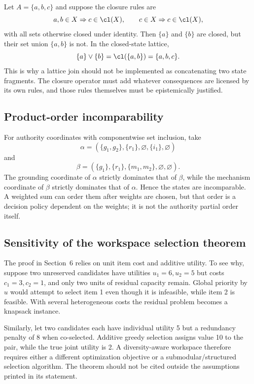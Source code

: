 Let \(A=\{a,b,c\}\) and suppose the closure rules are
\[
a,b\in X\Rightarrow c\in\cl(X),
\qquad c\in X\Rightarrow c\in\cl(X),
\]
with all sets otherwise closed under identity. Then \(\{a\}\) and \(\{b\}\) are closed, but their set union \(\{a,b\}\) is not. In the closed-state lattice,
\[
\{a\}\vee\{b\}
=\cl(\{a,b\})
=\{a,b,c\}.
\]
This is why a lattice join should not be implemented as concatenating two state fragments. The closure operator must add whatever consequences are licensed by its own rules, and those rules themselves must be epistemically justified.

\subsection{Product-order incomparability}

For authority coordinates with componentwise set inclusion, take
\[
\alpha=(\{g_1,g_2\},\{r_1\},\varnothing,\{i_1\},\varnothing)
\]
and
\[
\beta=(\{g_1\},\{r_1\},\{m_1,m_2\},\varnothing,\varnothing).
\]
The grounding coordinate of \(\alpha\) strictly dominates that of \(\beta\), while the mechanism coordinate of \(\beta\) strictly dominates that of \(\alpha\). Hence the states are incomparable. A weighted sum can order them after weights are chosen, but that order is a decision policy dependent on the weights; it is not the authority partial order itself.

\subsection{Sensitivity of the workspace selection theorem}

The proof in Section~6 relies on unit item cost and additive utility. To see why, suppose two unreserved candidates have utilities \(u_1=6,u_2=5\) but costs \(c_1=3,c_2=1\), and only two units of residual capacity remain. Global priority by \(u\) would attempt to select item 1 even though it is infeasible, while item 2 is feasible. With several heterogeneous costs the residual problem becomes a knapsack instance.

Similarly, let two candidates each have individual utility 5 but a redundancy penalty of 8 when co-selected. Additive greedy selection assigns value 10 to the pair, while the true joint utility is 2. A diversity-aware workspace therefore requires either a different optimization objective or a submodular/structured selection algorithm. The theorem should not be cited outside the assumptions printed in its statement.

